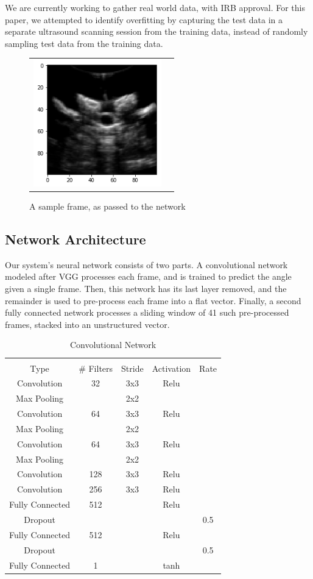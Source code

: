 \documentclass{article}
\begin{document}
We are currently working to gather real world data, with IRB approval. For this paper, we attempted to identify overfitting by capturing the test data in a separate ultrasound scanning session from the training data, instead of randomly sampling test data from the training data. 


\begin{figure}
\centering
\begin{tabular}{cc}
\centering
\includegraphics[height=5.5cm,keepaspectratio]{SampleInput}
\end{tabular}
\caption{A sample frame, as passed to the network
}
\end{figure}

\subsection{Network Architecture}
\label{ssec:Network Architecture}
Our system's neural network consists of two parts. A convolutional network modeled after VGG processes each frame, and is trained to predict the angle given a single frame. Then, this network has its last layer removed, and the remainder is used to pre-process each frame into a flat vector. Finally, a second fully connected network processes a sliding window of 41 such pre-processed frames, stacked into an unstructured vector.

\begin{table}[ht]
\caption{Convolutional Network}
\begin{tabular}{c c c c c}
\hline \\
Type & \# Filters & Stride & Activation & Rate \\
\hline
Convolution & 32 & 3x3 & Relu \\
Max Pooling &    & 2x2 &      \\
Convolution & 64 & 3x3 & Relu \\
Max Pooling &    & 2x2 &      \\
Convolution & 64 & 3x3 & Relu \\
Max Pooling &    & 2x2 &      \\
Convolution &128 & 3x3 & Relu \\
Convolution &256 & 3x3 & Relu \\
Fully Connected & 512 & & Relu \\
Dropout & & & & 0.5 \\
Fully Connected & 512 & & Relu \\
Dropout & & & & 0.5 \\
Fully Connected & 1 & & tanh \\
\end{tabular}
\end{table}
\end{document}
